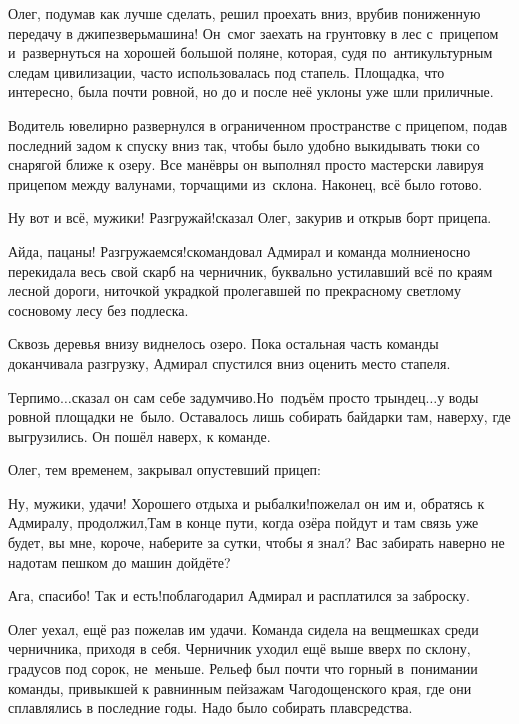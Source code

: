 Олег, подумав как лучше сделать, решил проехать вниз, врубив пониженную передачу в джипе\mdash зверь\nobreakdash\sdash\nobreakdash машина! Он~смог заехать на грунтовку в лес с~прицепом и~развернуться на хорошей большой поляне, которая, судя по~антикультурным следам цивилизации, часто использовалась под стапель. Площадка, что интересно, была почти ровной, но до и после неё уклоны уже шли приличные.

Водитель ювелирно развернулся в ограниченном пространстве с прицепом, подав последний задом к спуску вниз так, чтобы было удобно выкидывать тюки со снарягой ближе к озеру. Все манёвры он выполнял просто мастерски лавируя прицепом между валунами, торчащими из~склона. Наконец, всё было готово.

\diagdash Ну вот и всё, мужики! Разгружай!\mdash сказал Олег, закурив и открыв борт прицепа.

\diagdash Айда, пацаны! Разгружаемся!\mdash скомандовал Адмирал и команда молниеносно перекидала весь свой скарб на черничник, буквально устилавший всё по краям лесной дороги, ниточкой украдкой пролегавшей по прекрасному светлому сосновому лесу без подлеска. 

Сквозь деревья внизу виднелось озеро. Пока остальная часть команды доканчивала разгрузку, Адмирал спустился вниз оценить место стапеля. 

\diagdash Терпимо$\ldots$\mdash сказал он сам себе задумчиво.\mdash Но~подъём просто трындец$\ldots$\mdash у воды ровной площадки не~было. Оставалось лишь собирать байдарки там, наверху, где выгрузились. Он пошёл наверх, к команде.

Олег, тем временем, закрывал опустевший прицеп:

\diagdash Ну, мужики, удачи! Хорошего отдыха и рыбалки!\mdash пожелал он им и, обратясь к Адмиралу, продолжил,\mdash Там в конце пути, когда озёра пойдут и там связь уже будет, вы мне, короче, наберите за сутки, чтобы я знал? Вас забирать наверно не надо\mdash там пешком до машин дойдёте?

\diagdash Ага, спасибо! Так и есть!\mdash поблагодарил Адмирал и расплатился за заброску.

Олег уехал, ещё раз пожелав им удачи. Команда сидела на вещмешках среди черничника, приходя в себя. Черничник уходил ещё выше вверх по склону, градусов под сорок, не~меньше. Рельеф был почти что горный в~понимании команды, привыкшей к равнинным пейзажам Чагодощенского края, где они сплавлялись в последние годы. Надо было собирать плавсредства.


